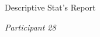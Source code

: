 \documentclass{article}
\begin{document}


\huge Descriptive Stat's Report 

\emph{Participant 28}
\end{document}
